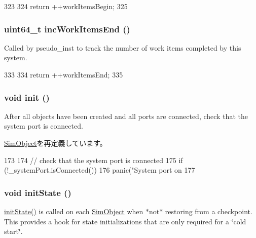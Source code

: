 \begin{DoxyCode}
323     {
324         return ++workItemsBegin;
325     }
\end{DoxyCode}
\hypertarget{classSystem_a46800c998630f686bcdea38091fab11d}{
\subsubsection[{incWorkItemsEnd}]{\setlength{\rightskip}{0pt plus 5cm}uint64\_\-t incWorkItemsEnd ()}}
\label{classSystem_a46800c998630f686bcdea38091fab11d}
Called by pseudo\_\-inst to track the number of work items completed by this system. 


\begin{DoxyCode}
333     {
334         return ++workItemsEnd;
335     }
\end{DoxyCode}
\hypertarget{classSystem_a02fd73d861ef2e4aabb38c0c9ff82947}{
\subsubsection[{init}]{\setlength{\rightskip}{0pt plus 5cm}void init ()}}
\label{classSystem_a02fd73d861ef2e4aabb38c0c9ff82947}
After all objects have been created and all ports are connected, check that the system port is connected. 

\hyperlink{classSimObject_a02fd73d861ef2e4aabb38c0c9ff82947}{SimObject}を再定義しています。


\begin{DoxyCode}
173 {
174     // check that the system port is connected
175     if (!_systemPort.isConnected())
176         panic("System port on %
177 }
\end{DoxyCode}
\hypertarget{classSystem_a3c34ea9b29f410748d4435a667484924}{
\subsubsection[{initState}]{\setlength{\rightskip}{0pt plus 5cm}void initState ()}}
\label{classSystem_a3c34ea9b29f410748d4435a667484924}
\hyperlink{classSystem_a3c34ea9b29f410748d4435a667484924}{initState()} is called on each \hyperlink{classSimObject}{SimObject} when $\ast$not$\ast$ restoring from a checkpoint. This provides a hook for state initializations that are only required for a \char`\"{}cold start\char`\"{}. 

